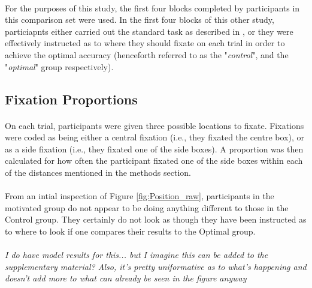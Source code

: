 \documentclass[12pt]{article}
\begin{document}
\paragraph{} For the purposes of this study, the first four blocks completed by participants in this comparison set were used. In the first four blocks of this other study, particiapnts either carried out the standard task as described in \cite{clarke2015failure}, or they were effectively instructed as to where they should fixate on each trial in order to achieve the optimal accuracy (henceforth referred to as the "\textit{control}", and the "\textit{optimal}" group respectively).

\subsection*{Fixation Proportions}
\paragraph{} On each trial, participants were given three possible locations to fixate. Fixations were coded as being either a central fixation (i.e., they fixated the centre box), or as a side fixation (i.e., they fixated one of the side boxes). A proportion was then calculated for how often the participant fixated one of the side boxes within each of the distances mentioned in the methods section. 

\paragraph{} From an intial inspection of Figure \ref{fig:Position_raw}, participants in the motivated group do not appear to be doing anything different to those in the Control group. They certainly do not look as though they have been instructed as to where to look if one compares their results to the Optimal group. 

\paragraph{} \textit{I do have model results for this... but I imagine this can be added to the supplementary material? Also, it's pretty uniformative as to what's happening and doesn't add more to what can already be seen in the figure anyway}
\end{document}
